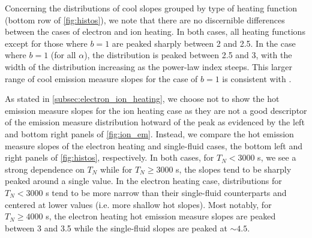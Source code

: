 \documentclass[tighten,apj]{emulateapj}
\begin{document}
	\par Concerning the distributions of cool slopes grouped by type of heating function (bottom row of \autoref{fig:histos}), we note that there are no discernible differences between the cases of electron and ion heating. In both cases, all heating functions except for those where $b=1$ are peaked sharply between 2 and 2.5. In the case where $b=1$ (for all $\alpha$), the distribution is peaked between 2.5 and 3, with the width of the distribution increasing as the power-law index steeps. This larger range of cool emission measure slopes for the case of $b=1$ is consistent with \citet{cargill_active_2014}.
	\par As stated in \autoref{subsec:electron_ion_heating}, we choose not to show the hot emission measure slopes for the ion heating case as they are not a good descriptor of the emission measure distribution hotward of the peak as evidenced by the left and bottom right panels of \autoref{fig:ion_em}. Instead, we compare the hot emission measure slopes of the electron heating and single-fluid cases, the bottom left and right panels of \autoref{fig:histos}, respectively. In both cases, for $T_N<3000$ s, we see a strong dependence on $T_N$ while for $T_N\ge3000$ s, the slopes tend to be sharply peaked around a single value. In the electron heating case, distributions for $T_N<3000$ s tend to be more narrow than their single-fluid counterparts and centered at lower values (i.e. more shallow hot slopes). Most notably, for $T_N\ge4000$ s, the electron heating hot emission measure slopes are peaked between 3 and 3.5 while the single-fluid slopes are peaked at $\sim4.5$. 
\end{document}
